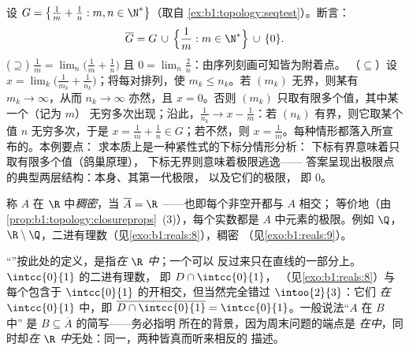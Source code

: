 \begin{example}[精确计算一个闭包]\label{ex:b1:topology:closurecomputed}
设 $G = \bigl\{\frac1m + \frac1n : m, n \in \N^*\bigr\}$（取自
\cref{ex:b1:topology:seqtest}）。断言：
\[
\overline G = G \,\cup\, \Bigl\{\frac1m : m \in \N^*\Bigr\}
\,\cup\, \{0\} .
\]
($\supseteq$) $\frac1m = \lim_n \bigl(\frac1m + \frac1n\bigr)$
且 $0 = \lim_n \frac2n$：由序列刻画可知皆为附着点。
（$\subseteq$）设 $x = \lim_k \bigl(
\frac{1}{m_k} + \frac{1}{n_k}\bigr)$；将每对排列，使
$m_k \leq n_k$。若 $(m_k)$ 无界，则某有 $m_k
\to \infty$，从而 $n_k \to \infty$ 亦然，且 $x = 0$。否则
$(m_k)$ 只取有限多个值，其中某一个（记为 $m$）
无穷多次出现；沿此，$\frac{1}{n_k} \to x -
\frac1m$：若 $(n_k)$ 有界，则它取某个值 $n$
无穷多次，于是 $x = \frac1m + \frac1n \in G$；若不然，则 $x =
\frac1m$。每种情形都落入所宣布的。本例要点：
求本质上是一种紧性式的下标分情形分析：
下标有界意味着只取有限多个值（鸽巢原理），
下标无界则意味着极限逃逸——
答案呈现出极限点的典型两层结构：本身、其第一代极限，
以及它们的极限，
即 $0$。
\end{example}

\begin{definition}\label{def:b1:topology:dense}
称 $A$ 在 $\R$ 中\emph{稠密}，当 $\overline A = \R$
——也即每个非空开都与 $A$ 相交；
等价地（由\cref{prop:b1:topology:closureprops}~(3)），每个实数都是
$A$ 中元素的极限。例如 $\Q$，$\R \setminus
\Q$，二进有理数（见\cref{exo:b1:reals:8}），稠密
（见\cref{exo:b1:reals:9}）。
\end{definition}

\begin{example}[稠密性是相对的]\label{ex:b1:topology:relativedensity}
“”按此处的定义，是指\emph{在 $\R$ 中}；一个可以
反过来只在直线的一部分上。$\intcc{0}{1}$ 的二进有理数，
即 $D \cap \intcc{0}{1}$，
（见\cref{exo:b1:reals:8}）与每个包含于
$\intcc{0}{1}$ 的开相交，但当然完全错过 $\intoo{2}{3}$：它们
\emph{在} $\intcc{0}{1}$ 中，即 $\overline{D \cap
\intcc{0}{1}} = \intcc{0}{1}$。一般说法“$A$ 在 $B$ 中”
是 $B \subseteq \overline A$ 的简写——务必指明
所在的背景，因为周末问题的端点是
\emph{在中}，同时却\emph{在
$\R$ 中}无处：同一，两种皆真而听来相反的
描述。
\end{example}

